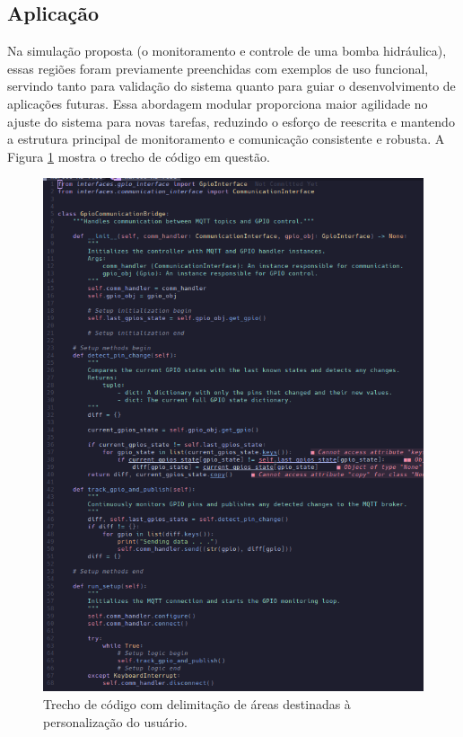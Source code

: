 \documentclass{ecatfg}
\begin{document}
\subsection{Aplicação}
 Na simulação proposta (o monitoramento e controle de uma bomba hidráulica), essas regiões foram previamente preenchidas com exemplos de uso funcional, servindo tanto para validação do sistema quanto para guiar o desenvolvimento de aplicações futuras. Essa abordagem modular proporciona maior agilidade no ajuste do sistema para novas tarefas, reduzindo o esforço de reescrita e mantendo a estrutura principal de monitoramento e comunicação consistente e robusta. A Figura \ref{fig:14} mostra o trecho de código em questão. \par

\begin{figure}[!htb]
    \centering
    \includegraphics[scale=0.273]{Figuras/communication_gpio_controller_preenchido.png}
    \caption{Trecho de código com delimitação de áreas destinadas à personalização do usuário.}
    \label{fig:14}
\end{figure}
\end{document}
